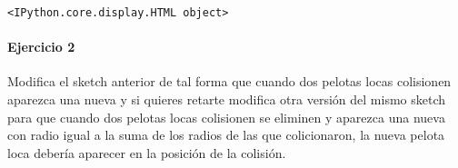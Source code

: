 \documentclass[11pt]{article}
\begin{document}
    
    
    \begin{verbatim}
<IPython.core.display.HTML object>
    \end{verbatim}

    
    \hypertarget{ejercicio-2}{%
\paragraph{Ejercicio 2}\label{ejercicio-2}}

Modifica el sketch anterior de tal forma que cuando dos pelotas locas
colisionen aparezca una nueva y si quieres retarte modifica otra versión
del mismo sketch para que cuando dos pelotas locas colisionen se
eliminen y aparezca una nueva con radio igual a la suma de los radios de
las que colicionaron, la nueva pelota loca debería aparecer en la
posición de la colisión.


    
    
    
    
\end{document}
